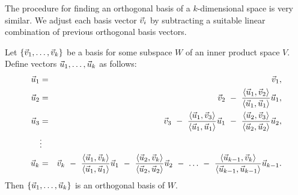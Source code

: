 \documentclass{ximera}
\begin{document}
The procedure for finding an orthogonal basis of a $k$-dimensional
space is very similar. We adjust each basis vector $\vec{v}_i$ by
subtracting a suitable linear combination of previous orthogonal basis
vectors.

\begin{proposition}\label{prop:gram-schmidt-k}
  Let $\left\{\vec{v}_1,\ldots,\vec{v}_k\right\}$ be a basis for some subspace $W$
  of an inner product space $V$.%
  Define vectors
  $\vec{u}_1,\ldots,\vec{u}_k$ as follows:
  \begin{eqnarray*}
    \vec{u}_1
    &=& \vec{v}_1,
    \\
    \vec{u}_2
    &=& \vec{v}_2
        ~-~ \frac{\langle \vec{u}_1,\vec{v}_2 \rangle}{\langle \vec{u}_1,\vec{u}_1 \rangle}\vec{u}_1,
    \\
    \vec{u}_3
    &=& \vec{v}_3
        ~-~ \frac{\langle \vec{u}_1,\vec{v}_3 \rangle}{\langle \vec{u}_1,\vec{u}_1 \rangle}\vec{u}_1
        ~-~ \frac{\langle \vec{u}_2,\vec{v}_3 \rangle}{\langle \vec{u}_2,\vec{u}_2 \rangle}\vec{u}_2,
    \\
    &\vdots&
    \\
    \vec{u}_k
    &=& \vec{v}_k
        ~-~ \frac{\langle \vec{u}_1,\vec{v}_k \rangle}{\langle \vec{u}_1,\vec{u}_1 \rangle}\vec{u}_1
        ~-~ \frac{\langle \vec{u}_2,\vec{v}_k \rangle}{\langle \vec{u}_2,\vec{u}_2 \rangle}\vec{u}_2
        ~-~ \ldots
        ~-~ \frac{\langle \vec{u}_{k-1},\vec{v}_k \rangle}{\langle \vec{u}_{k-1},\vec{u}_{k-1} \rangle}\vec{u}_{k-1}.
  \end{eqnarray*}
  Then $\left\{\vec{u}_1,\ldots,\vec{u}_k\right\}$ is an orthogonal basis of $W$.
\end{proposition}
\end{document}
